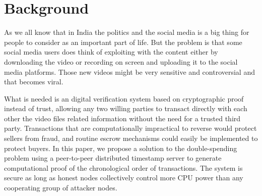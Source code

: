 \chapter{Background}
\label{Ch2}
\bigskip
As we all know that in India the politics and the social media is a big thing for people to consider as an important part of life. But the problem is that some social media users does think of exploiting with the content either by downloading the video or recording on screen and uploading it to the social media platforms. Those new videos might be very sensitive and controversial and that becomes viral.
\par What is needed is an digital verification system based on cryptographic proof instead of trust,
allowing any two willing parties to transact directly with each other the video files related information without the need for a trusted third party. Transactions that are computationally impractical to reverse would protect sellers from fraud, and routine escrow mechanisms could easily be implemented to protect buyers. In this paper, we propose a solution to the double-spending problem using a peer-to-peer distributed timestamp server to generate computational proof of the chronological order of transactions. The system is secure as long as honest nodes collectively control more CPU power than any cooperating group of attacker nodes.

